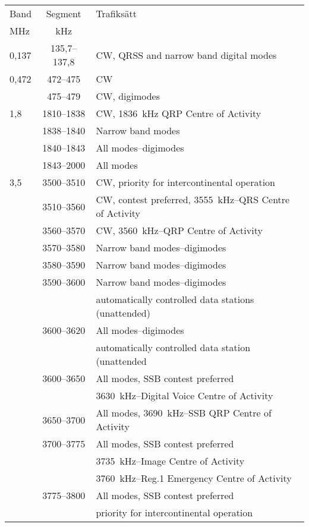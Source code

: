 \setlongtables
\begin{longtable}{lcl}
Band & Segment & Trafiksätt \\
MHz  & kHz     & \\ \hline
\endhead

0,137 & 135,7--137,8 & CW, QRSS and narrow band digital modes\\

0,472 & 472--475 & CW\\
 & 475--479 & CW, digimodes\\

1,8  & 1810--1838 & CW, 1836~kHz QRP Centre of Activity\\
     & 1838--1840 & Narrow band modes\\
     & 1840--1843 & All modes--digimodes\\
     & 1843--2000 & All modes\\

3,5  & 3500--3510 & CW, priority for intercontinental operation\\
     & 3510--3560 & CW, contest preferred, 3555~kHz--QRS Centre of Activity\\
     & 3560--3570 & CW, 3560~kHz--QRP Centre of Activity\\
     & 3570--3580 & Narrow band modes--digimodes\\
     & 3580--3590 & Narrow band modes--digimodes\\
     & 3590--3600 & Narrow band modes--digimodes\\
     & & automatically controlled data stations (unattended)\\
     & 3600--3620 & All modes--digimodes\\
     & & automatically controlled data station (unattended\\
     & 3600--3650 & All modes, SSB contest preferred\\
     & & 3630~kHz--Digital Voice Centre of Activity\\
     & 3650--3700 & All modes, 3690~kHz--SSB QRP Centre of Activity\\
     & 3700--3775 & All modes, SSB contest preferred\\
     & & 3735~kHz--Image Centre of Activity\\
     & & 3760~kHz--Reg.1 Emergency Centre of Activity\\
     & 3775--3800 & All modes, SSB contest preferred\\
     & & priority for intercontinental operation\\


\end{longtable}

